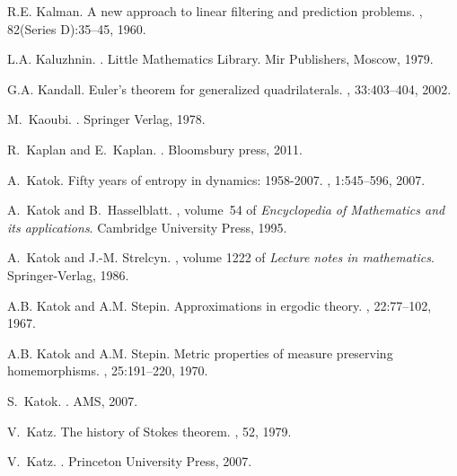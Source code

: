 \documentclass[12pt]{amsart}
\begin{document}
\begin{thebibliography}{100}
R.E. Kalman.
\newblock A new approach to linear filtering and prediction problems.
,
  82(Series D):35--45, 1960.

L.A. Kaluzhnin.
.
\newblock Little Mathematics Library. Mir Publishers, Moscow, 1979.

G.A. Kandall.
\newblock Euler's theorem for generalized quadrilaterals.
, 33:403--404, 2002.

M.~Kaoubi.
.
\newblock Springer Verlag, 1978.

R.~Kaplan and E.~Kaplan.
.
\newblock Bloomsbury press, 2011.

A.~Katok.
\newblock Fifty years of entropy in dynamics: 1958-2007.
, 1:545--596, 2007.

A.~Katok and B.~Hasselblatt.
,
  volume~54 of {\em Encyclopedia of Mathematics and its applications}.
\newblock Cambridge {University} Press, 1995.

A.~Katok and J.-M. Strelcyn.
, volume 1222 of {\em Lecture notes in mathematics}.
\newblock Springer-Verlag, 1986.

A.B. Katok and A.M. Stepin.
\newblock Approximations in ergodic theory.
, 22:77--102, 1967.

A.B. Katok and A.M. Stepin.
\newblock Metric properties of measure preserving homemorphisms.
, 25:191--220, 1970.

S.~Katok.
.
\newblock AMS, 2007.

V.~Katz.
\newblock The history of {Stokes} theorem.
, 52, 1979.

V.~Katz.
.
\newblock Princeton University Press, 2007.


\end{thebibliography}
\end{document}

